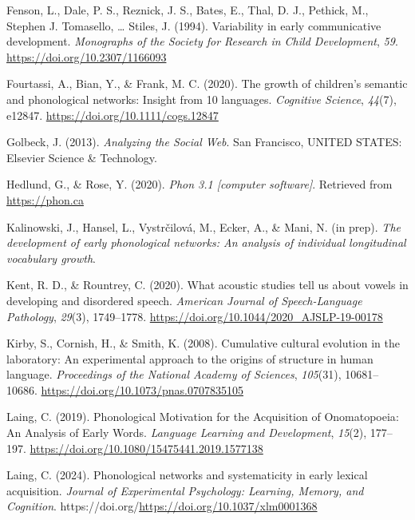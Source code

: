 \documentclass[
  man]{apa6}
\newlength{\cslhangindent}
\newenvironment{CSLReferences}[2] %
 {\begin{list}{}{%
  \setlength{\itemindent}{0pt}
  \setlength{\leftmargin}{0pt}
  \setlength{\parsep}{0pt}
  \ifodd #1
   \setlength{\leftmargin}{\cslhangindent}
   \setlength{\itemindent}{-1\cslhangindent}
  \fi
  \setlength{\itemsep}{#2\baselineskip}}}
 {\end{list}}
\begin{document}
\begin{CSLReferences}{1}{0}
Fenson, L., Dale, P. S., Reznick, J. S., Bates, E., Thal, D. J., Pethick, M., Stephen J. Tomasello, \ldots{} Stiles, J. (1994). Variability in early communicative development. \emph{Monographs of the Society for Research in Child Development}, \emph{59}. \url{https://doi.org/10.2307/1166093}

Fourtassi, A., Bian, Y., \& Frank, M. C. (2020). The growth of children's semantic and phonological networks: Insight from 10 languages. \emph{Cognitive Science}, \emph{44}(7), e12847. \url{https://doi.org/10.1111/cogs.12847}

Golbeck, J. (2013). \emph{Analyzing the {Social} {Web}}. San Francisco, UNITED STATES: Elsevier Science \& Technology.

Hedlund, G., \& Rose, Y. (2020). \emph{Phon 3.1 {[}computer software{]}}. Retrieved from \url{https://phon.ca}

Kalinowski, J., Hansel, L., Vystrčilová, M., Ecker, A., \& Mani, N. (in prep). \emph{The development of early phonological networks: {An} analysis of individual longitudinal vocabulary growth}.

Kent, R. D., \& Rountrey, C. (2020). What acoustic studies tell us about vowels in developing and disordered speech. \emph{American Journal of Speech-Language Pathology}, \emph{29}(3), 1749--1778. \url{https://doi.org/10.1044/2020_AJSLP-19-00178}

Kirby, S., Cornish, H., \& Smith, K. (2008). Cumulative cultural evolution in the laboratory: {An} experimental approach to the origins of structure in human language. \emph{Proceedings of the National Academy of Sciences}, \emph{105}(31), 10681--10686. \url{https://doi.org/10.1073/pnas.0707835105}

Laing, C. (2019). Phonological {Motivation} for the {Acquisition} of {Onomatopoeia}: {An} {Analysis} of {Early} {Words}. \emph{Language Learning and Development}, \emph{15}(2), 177--197. \url{https://doi.org/10.1080/15475441.2019.1577138}

Laing, C. (2024). Phonological networks and systematicity in early lexical acquisition. \emph{Journal of Experimental Psychology: Learning, Memory, and Cognition}. https://doi.org/\url{https://doi.org/10.1037/xlm0001368}


\end{CSLReferences}
\end{document}
